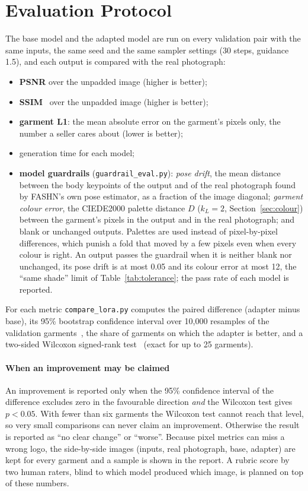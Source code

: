 \section{Evaluation Protocol}
\label{sec:eval}

The base model and the adapted model are run on every validation pair with the same inputs, the same seed and the same sampler settings (30 steps, guidance 1.5), and each output is compared with the real photograph:
\begin{itemize}
\item \textbf{PSNR} over the unpadded image (higher is better);
\item \textbf{SSIM}~\cite{ssim} over the unpadded image (higher is better);
\item \textbf{garment L1}: the mean absolute error on the garment's pixels only, the number a seller cares about (lower is better);
\item generation time for each model;
\item \textbf{model guardrails} (\texttt{guardrail\_eval.py}): \emph{pose drift}, the mean distance between the body keypoints of the output and of the real photograph found by FASHN's own pose estimator, as a fraction of the image diagonal; \emph{garment colour error}, the CIEDE2000 palette distance $D$ ($k_L = 2$, Section~\ref{sec:colour}) between the garment's pixels in the output and in the real photograph; and blank or unchanged outputs. Palettes are used instead of pixel-by-pixel differences, which punish a fold that moved by a few pixels even when every colour is right. An output passes the guardrail when it is neither blank nor unchanged, its pose drift is at most 0.05 and its colour error at most 12, the ``same shade'' limit of Table~\ref{tab:tolerance}; the pass rate of each model is reported.
\end{itemize}
For each metric \texttt{compare\_lora.py} computes the paired difference (adapter minus base), its 95\% bootstrap confidence interval over 10{,}000 resamples of the validation garments~\cite{bootstrap}, the share of garments on which the adapter is better, and a two-sided Wilcoxon signed-rank test~\cite{wilcoxon} (exact for up to 25 garments).

\paragraph{When an improvement may be claimed} An improvement is reported only when the 95\% confidence interval of the difference excludes zero in the favourable direction \emph{and} the Wilcoxon test gives $p < 0.05$. With fewer than six garments the Wilcoxon test cannot reach that level, so very small comparisons can never claim an improvement. Otherwise the result is reported as ``no clear change'' or ``worse''. Because pixel metrics can miss a wrong logo, the side-by-side images (inputs, real photograph, base, adapter) are kept for every garment and a sample is shown in the report. A rubric score by two human raters, blind to which model produced which image, is planned on top of these numbers.

